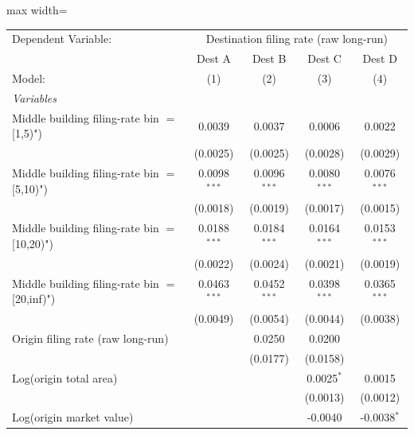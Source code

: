 \documentclass[
  11pt,
]{article}
\begin{document}
\begin{adjustbox}{max width=\textwidth}
\begingroup
\centering
\begin{tabular}{lcccc}
   \tabularnewline \midrule \midrule
   Dependent Variable: & \multicolumn{4}{c}{Destination filing rate (raw long-run)}\\
                                                  & Dest A         & Dest B         & Dest C         & Dest D \\   
   Model:                                         & (1)            & (2)            & (3)            & (4)\\  
   \midrule
   \emph{Variables}\\
   Middle building filing-rate bin $=$ [1,5)")    & 0.0039         & 0.0037         & 0.0006         & 0.0022\\   
                                                  & (0.0025)       & (0.0025)       & (0.0028)       & (0.0029)\\   
   Middle building filing-rate bin $=$ [5,10)")   & 0.0098$^{***}$ & 0.0096$^{***}$ & 0.0080$^{***}$ & 0.0076$^{***}$\\   
                                                  & (0.0018)       & (0.0019)       & (0.0017)       & (0.0015)\\   
   Middle building filing-rate bin $=$ [10,20)")  & 0.0188$^{***}$ & 0.0184$^{***}$ & 0.0164$^{***}$ & 0.0153$^{***}$\\   
                                                  & (0.0022)       & (0.0024)       & (0.0021)       & (0.0019)\\   
   Middle building filing-rate bin $=$ [20,inf)") & 0.0463$^{***}$ & 0.0452$^{***}$ & 0.0398$^{***}$ & 0.0365$^{***}$\\   
                                                  & (0.0049)       & (0.0054)       & (0.0044)       & (0.0038)\\   
   Origin filing rate (raw long-run)              &                & 0.0250         & 0.0200         &   \\   
                                                  &                & (0.0177)       & (0.0158)       &   \\   
   Log(origin total area)                         &                &                & 0.0025$^{*}$   & 0.0015\\   
                                                  &                &                & (0.0013)       & (0.0012)\\   
   Log(origin market value)                       &                &                & -0.0040        & -0.0038$^{*}$\\   

\end{tabular}
\end{adjustbox}
\end{document}
